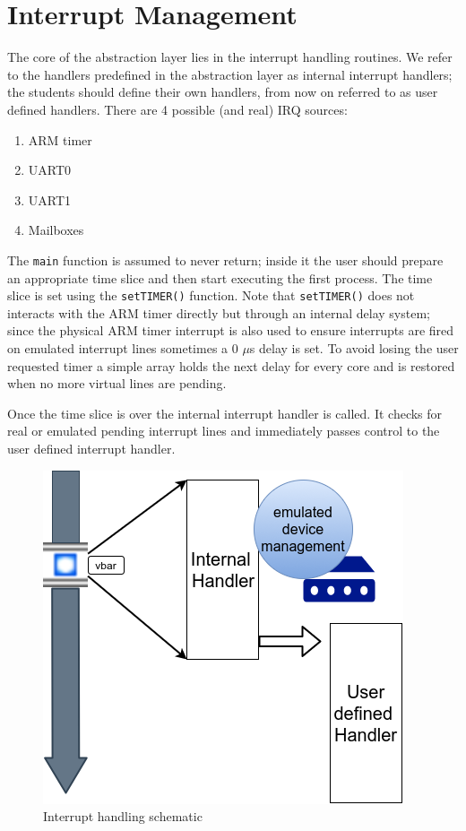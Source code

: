 \documentclass[12pt,a4paper,openright,twoside]{report}
\begin{document}
\section{Interrupt Management}
\label{regcorruption}
The core of the abstraction layer lies in the interrupt handling routines. We refer
to the handlers predefined in the abstraction layer as internal interrupt handlers;
 the students should define their own handlers, from now on referred to as user defined handlers.
There are 4 possible (and real) IRQ sources:
\begin{enumerate}
    \item ARM timer
    \item UART0
    \item UART1
    \item Mailboxes
\end{enumerate}
The {\tt main} function is assumed to never return; inside it the user should
prepare an appropriate time slice and then start executing the first process.
The time slice is set using the {\tt setTIMER()} function.
Note that {\tt setTIMER()} does not interacts with the ARM timer directly but 
through an internal delay system; since the physical ARM timer interrupt is also
used to ensure interrupts are fired on emulated interrupt lines sometimes a
0 $\mu$s delay is set. To avoid losing the user requested timer a simple array 
holds the next delay for every core and is restored when no more virtual 
lines are pending.

 Once the time slice is over the internal interrupt handler is called. 
 It checks for real or emulated pending interrupt lines and immediately
 passes control to the user defined interrupt handler.

 \begin{figure}[h]
    \begin{center}
 \includegraphics[scale=0.8]{images/tesi6.png}
 \caption[IRQ Switch]{Interrupt handling schematic}\label{fig:irq}
    \end{center}
 \end{figure}
\end{document}
